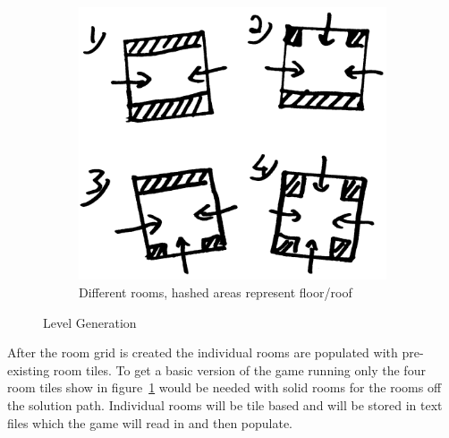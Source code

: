 \begin{figure}[ht]
\begin{subfigure}{.5\textwidth}
  \includegraphics[scale=0.2, trim = 0cm 0cm 0cm 2cm]{images/16x16}	
  \caption{Different rooms, hashed areas represent floor/roof}
  \label{fig:sub2:level}
\end{subfigure}
\caption{Level Generation}
\label{fig:level_gen}
\end{figure}


After the room grid is created the individual rooms are populated with pre-existing room tiles. To get a basic version of the game running only the four room tiles show in figure~\ref{fig:sub2:level} would be needed with solid rooms for the rooms off the solution path. Individual rooms will be tile based and will be stored in text files which the game will read in and then populate.
